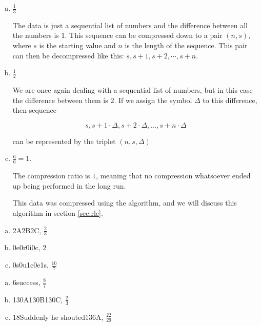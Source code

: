 \begin{Answer}[ref={compression-ratio}]

  \begin{enumerate}[(a)]
  \item $\frac{1}{3}$

    The data is just a sequential list of numbers and the difference
    between all the numbers is $1$. This sequence can be compressed
    down to a pair $(n,s)$, where $s$ is the starting value and $n$ is
    the length of the sequence. This pair can then be decompressed
    like this: $s,s+1,s+2,\cdots,s+n$.

  \item $\frac{1}{2}$

    We are once again dealing with a sequential list of numbers, but
    in this case the difference between them is $2$. If we assign the
    symbol $\Delta$ to this difference, then sequence

    \begin{equation*}
      s, s + 1 \cdot \Delta, s + 2 \cdot \Delta, \dots, s + n \cdot \Delta
    \end{equation*}

    can be represented by the triplet $(n,s,\Delta)$

  \item $\frac{6}{6} = 1$.

    The compression ratio is $1$, meaning that no compression
    whatsoever ended up being performed in the long run.

    This data was compressed using the \rle algorithm, and we will
    discuss this algorithm in section \ref{sec:rle}.

  \end{enumerate}
\end{Answer}

\begin{Answer}[ref={rle-compression}]

  \begin{enumerate}[(a)]
  \item 2A2B2C, $\frac{2}{3}$
  \item 0e0r0i0c, $2$
  \item 0s0u1c0e1s, $\frac{10}{7}$
  \end{enumerate}

\end{Answer}

\begin{Answer}[ref={packbits-rle}]

  \begin{enumerate}[(a)]
  \item 6success, $\frac{8}{7}$
  \item 130A130B130C, $\frac{2}{3}$
  \item 18Suddenly he shouted136A, $\frac{22}{29}$
  \end{enumerate}

\end{Answer}

